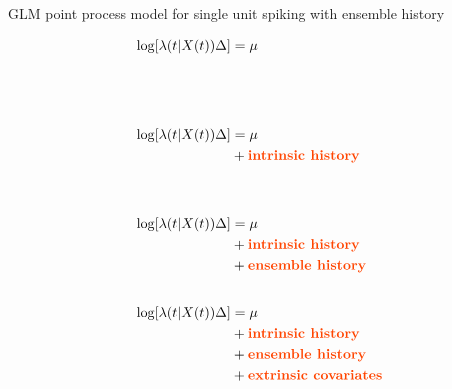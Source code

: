 \documentclass[svgnames,13pt,handout]{beamer}
\DeclareRobustCommand{\emph}[1]{\textbf{{\color{emphasizecolor} #1}}}
\begin{document}
\begin{frame}{GLM point process model for single unit spiking with ensemble history}
\begin{overprint}
	\[\begin{aligned}\log[\lambda(t|X(t))\Delta] &= \mu \\
	&\phantom{{}+ \text{\emph{intrinsic history}}} \\
	&\phantom{{}+ \text{\emph{ensemble history}}}\\
	&\phantom{{}+ \text{\emph{extrinsic covariates}}}\end{aligned}\]
	\onslide<2|handout:0>
	\[\begin{aligned}\log[\lambda(t|X(t))\Delta] &= \mu \\
	&{}+ \text{\emph{intrinsic history}} \\
	&\phantom{{}+ \text{\emph{ensemble history}}}\\
	&\phantom{{}+ \text{\emph{extrinsic covariates}}}\end{aligned}\]
	\onslide<3|handout:0>
	\[\begin{aligned}\log[\lambda(t|X(t))\Delta] &= \mu \\
	&{}+ \text{\emph{intrinsic history}} \\
	&{}+ \text{\emph{ensemble history}}\\
	&\phantom{{}+ \text{\emph{extrinsic covariates}}}\end{aligned}\]
	\onslide<4>
	\[\begin{aligned}\log[\lambda(t|X(t))\Delta] &= \mu \\
	&{}+ \text{\emph{intrinsic history}} \\
	&{}+ \text{\emph{ensemble history}}\\
	&{}+ \text{\emph{extrinsic covariates}}\end{aligned}\]
\end{overprint}
\end{frame} 
\end{document}

